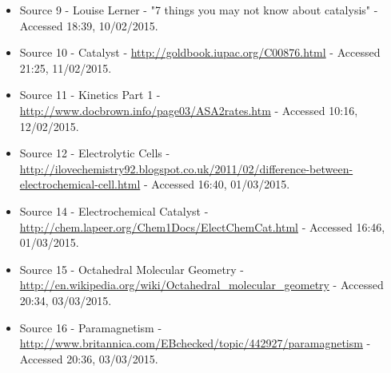 \begin{itemize}
\item Source 9 - Louise Lerner - "7 things you may not know about catalysis" - Accessed 18:39, 10/02/2015.

\item Source 10 - Catalyst - \url{http://goldbook.iupac.org/C00876.html} - Accessed 21:25, 11/02/2015.

\item Source 11 - Kinetics Part 1 - \url{http://www.docbrown.info/page03/ASA2rates.htm} - Accessed 10:16, 12/02/2015.

\item Source 12 - Electrolytic Cells - \url{http://ilovechemistry92.blogspot.co.uk/2011/02/difference-between-electrochemical-cell.html} - Accessed 16:40, 01/03/2015.

\item Source 14 - Electrochemical Catalyst - \url{http://chem.lapeer.org/Chem1Docs/ElectChemCat.html} - Accessed 16:46, 01/03/2015.

\item Source 15 - Octahedral Molecular Geometry - \url{http://en.wikipedia.org/wiki/Octahedral_molecular_geometry} - Accessed 20:34, 03/03/2015.

\item Source 16 - Paramagnetism - \url{http://www.britannica.com/EBchecked/topic/442927/paramagnetism} - Accessed 20:36, 03/03/2015.





\end{itemize}





